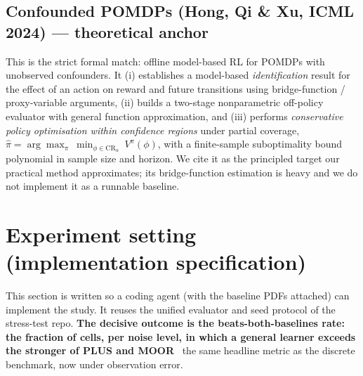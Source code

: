 \documentclass[11pt]{article}
\begin{document}
\subsection{Confounded POMDPs (Hong, Qi \& Xu, ICML 2024) --- theoretical anchor}
This is the strict formal match: offline model-based RL for POMDPs with unobserved
confounders. It (i) establishes a model-based \emph{identification} result for the
effect of an action on reward and future transitions using bridge-function /
proxy-variable arguments, (ii) builds a two-stage nonparametric off-policy
evaluator with general function approximation, and (iii) performs \emph{conservative
policy optimisation within confidence regions} under partial coverage,
$\widehat{\pi} = \arg\max_{\pi}\ \min_{\phi\in\mathrm{CR}_\alpha}\ V^{\pi}(\phi)$,
with a finite-sample suboptimality bound polynomial in sample size and horizon. We
cite it as the principled target our practical method approximates; its
bridge-function estimation is heavy and we do not implement it as a runnable
baseline.

\section{Experiment setting (implementation specification)}
\label{sec:exp}
This section is written so a coding agent (with the baseline PDFs attached) can
implement the study. It reuses the unified evaluator and seed protocol of the
stress-test repo. \textbf{The decisive outcome is the beats-both-baselines rate:
the fraction of cells, per noise level, in which a general learner exceeds the
stronger of PLUS and MOOR} \textemdash\ the same headline metric as the discrete
benchmark, now under observation error.
\end{document}
